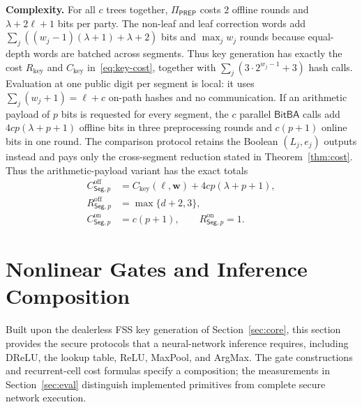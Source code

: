 \documentclass[journal]{IEEEtran}
\theoremstyle{definition}
\theoremstyle{plain}
\newcommand{\BitBA}{\mathsf{BitBA}}
\newcommand{\PREP}{\Pi_{\mathsf{PREP}}}
\newcommand{\nseg}{c}                              %
\newcommand{\wseg}{w}                              %
\begin{document}
\textbf{Complexity.} For all $\nseg$ trees together, $\PREP$ costs $2$ offline
rounds and $\lambda+2\ell+1$ bits per party. The non-leaf and leaf correction
words add
$\sum_j((\wseg_j-1)(\lambda+1)+\lambda+2)$ bits and
$\max_j\wseg_j$ rounds because equal-depth words are batched across segments.
Thus key generation has exactly the cost $R_{\mathrm{key}}$ and
$C_{\mathrm{key}}$ in~\eqref{eq:key-cost}, together with
$\sum_j(3\cdot2^{\wseg_j-1}+3)$ hash calls. Evaluation at one public digit per
segment is local: it uses $\sum_j(\wseg_j+1)=\ell+\nseg$ on-path hashes and no
communication.
If an arithmetic payload of $p$ bits is requested for every segment, the
$\nseg$ parallel $\BitBA$ calls add $4\nseg p(\lambda+p+1)$ offline bits in
three preprocessing rounds and $\nseg(p+1)$ online bits in one round. The
comparison protocol retains the Boolean $(L_j,e_j)$ outputs instead and pays
only the cross-segment reduction stated in Theorem~\ref{thm:cost}.
Thus the arithmetic-payload variant has the exact totals
\begin{equation}
\begin{aligned}
C^{\mathrm{off}}_{\mathsf{Seg},p}
 &=C_{\mathrm{key}}(\ell,\boldsymbol{\wseg})
   +4\nseg p(\lambda+p+1),\\
R^{\mathrm{off}}_{\mathsf{Seg},p}&=\max\{d+2,3\},\\
C^{\mathrm{on}}_{\mathsf{Seg},p}&=\nseg(p+1),\qquad
R^{\mathrm{on}}_{\mathsf{Seg},p}=1.
\end{aligned}
\label{eq:segment-payload-cost}
\end{equation}



\section{Nonlinear Gates and Inference Composition}\label{sec:infer}
Built upon the dealerless FSS key generation of Section~\ref{sec:core}, this
section provides the secure protocols that a neural-network inference requires,
including DReLU, the lookup table, ReLU, MaxPool, and ArgMax. The gate
constructions and recurrent-cell cost formulas specify a composition; the
measurements in Section~\ref{sec:eval} distinguish implemented primitives from
complete secure network execution.
\end{document}
